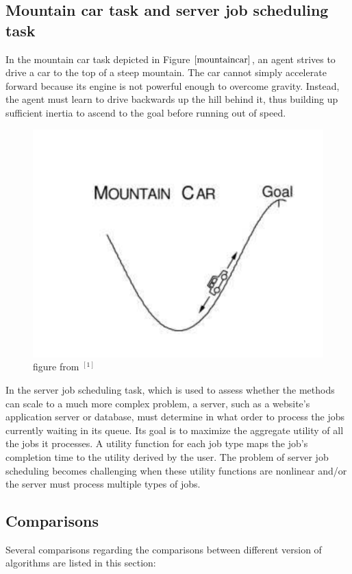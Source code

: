 \documentclass{article}
\begin{document}
\subsection{Mountain car task and server job scheduling task}
In the mountain car task depicted in Figure $\ref{mountaincar}$, an agent strives to drive a car to the top of a steep mountain. 
The car cannot simply accelerate forward because its engine is not powerful enough to overcome gravity. Instead, the agent must learn to drive backwards up the hill behind it, 
thus building up sufficient inertia to ascend to the goal before running out of speed.
\begin{figure}[htbp]
  \centering
  \includegraphics[width = .5\textwidth]{Mountaincar.png}
  \caption{figure from $^{[1]}$}
  \label{mountaincar}
\end{figure}

In the server job scheduling task, which is used to assess whether the methods can scale to a much more complex problem, a server, such as a website’s application server or database, 
must determine in what order to process the jobs currently waiting in its queue. Its goal is to maximize the aggregate utility of all the jobs it processes. 
A utility function for each job type maps the job’s completion time to the utility derived by the user.
 The problem of server job scheduling becomes challenging when these utility functions are nonlinear and/or the server must process multiple types of jobs.

\subsection{Comparisons}
Several comparisons regarding the comparisons between different version of algorithms are listed in this section:
\end{document}
